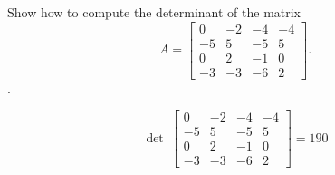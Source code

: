 
\begin{exerciseStatement}


Show how to compute the determinant of the matrix \[A= \left[\begin{array}{cccc}
0 & -2 & -4 & -4 \\
-5 & 5 & -5 & 5 \\
0 & 2 & -1 & 0 \\
-3 & -3 & -6 & 2
\end{array}\right] .\].


\end{exerciseStatement}
    
\begin{exerciseAnswer} 
\[\operatorname{det}\  \left[\begin{array}{cccc}
0 & -2 & -4 & -4 \\
-5 & 5 & -5 & 5 \\
0 & 2 & -1 & 0 \\
-3 & -3 & -6 & 2
\end{array}\right] = 190 \]
\end{exerciseAnswer}
    
